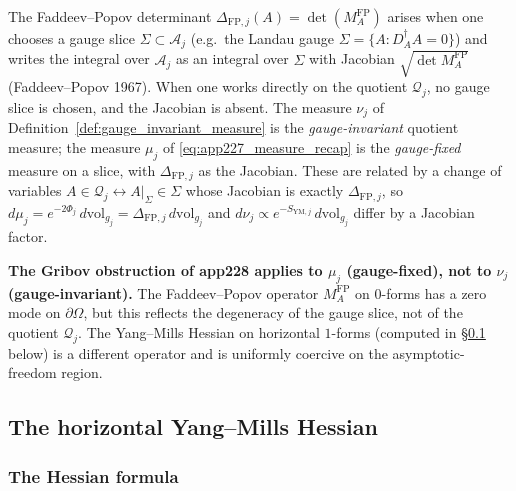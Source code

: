 \begin{remark}
\label{rem:fp_artifact}
The Faddeev--Popov determinant $\Delta_{\mathrm{FP},j}(A)=
\det(M_{A}^{\mathrm{FP}})$ arises when one chooses a gauge slice
$\Sigma\subset\mathcal{A}_{j}$ (e.g.\ the Landau gauge
$\Sigma=\{A:D_{A}^{\dagger}A=0\}$) and writes the integral over
$\mathcal{A}_{j}$ as an integral over $\Sigma$ with Jacobian
$\sqrt{\det M_{A}^{\mathrm{FP}}}$ (Faddeev--Popov 1967). When one
works directly on the quotient $\mathcal{Q}_{j}$, no gauge slice
is chosen, and the Jacobian is absent. The measure
$\nu_{j}$ of Definition~\ref{def:gauge_invariant_measure} is the
\emph{gauge-invariant} quotient measure; the measure $\mu_{j}$ of
\eqref{eq:app227_measure_recap} is the \emph{gauge-fixed} measure
on a slice, with $\Delta_{\mathrm{FP},j}$ as the Jacobian. These
are related by a change of variables
$A\in\mathcal{Q}_{j}\leftrightarrow A|_{\Sigma}\in\Sigma$ whose
Jacobian is exactly $\Delta_{\mathrm{FP},j}$, so
$d\mu_{j}=e^{-2\Phi_{j}}\,d\mathrm{vol}_{g_{j}}=
\Delta_{\mathrm{FP},j}\,d\mathrm{vol}_{g_{j}}$ and
$d\nu_{j}\propto e^{-S_{\mathrm{YM},j}}\,d\mathrm{vol}_{g_{j}}$
differ by a Jacobian factor.

\textbf{The Gribov obstruction of app228 applies to $\mu_{j}$
(gauge-fixed), not to $\nu_{j}$ (gauge-invariant).} The
Faddeev--Popov operator $M_{A}^{\mathrm{FP}}$ on $0$-forms has a
zero mode on $\partial\Omega$, but this reflects the degeneracy
of the gauge slice, not of the quotient $\mathcal{Q}_{j}$. The
Yang--Mills Hessian on horizontal $1$-forms (computed in
\S\ref{ssec:app229_ym_hessian} below) is a different operator and
is uniformly coercive on the asymptotic-freedom region.
\end{remark}

\subsection{The horizontal Yang--Mills Hessian}
\label{ssec:app229_ym_hessian}

\subsubsection{The Hessian formula}

